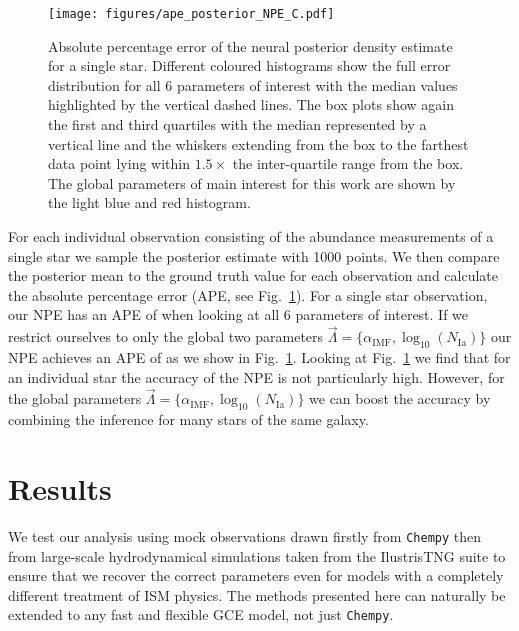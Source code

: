 \documentclass{aa}
\begin{document}
\begin{figure}[]
     \centering
     \texttt{[image: figures/ape\_posterior\_NPE\_C.pdf]}
     \vspace{-.5cm}
     \caption{Absolute percentage error of the neural posterior density estimate for a single star. Different coloured histograms show the full error distribution for all 6 parameters of interest with the median values highlighted by the vertical dashed lines. The box plots show again the first and third quartiles with the median represented by a vertical line and the whiskers extending from the box to the farthest data point lying within $1.5\times$ the inter-quartile range from the box. The global parameters of main interest for this work are shown by the light blue and red histogram.}
     \label{fig:posterior_APE}
\end{figure}


For each individual observation consisting of the abundance measurements of a single star we sample the posterior estimate with 1000 points. %
We then compare the posterior mean to the ground truth value for each observation and calculate the absolute percentage error (APE, see Fig.~\ref{fig:posterior_APE}). For a single star observation, our NPE has an APE of  when looking at all 6 parameters of interest. If we restrict ourselves to only the global two parameters $\vec\Lambda = \{\alpha_\mathrm{IMF},\log_{10}(N_\mathrm{Ia})\}$ our NPE achieves an APE of  as we show in Fig.~\ref{fig:posterior_APE}. Looking at Fig.~\ref{fig:posterior_APE} we find that for an individual star the accuracy of the NPE is not particularly high. However, for the global parameters $\vec\Lambda = \{\alpha_\mathrm{IMF},\log_{10}(N_\mathrm{Ia})\}$ we can boost the accuracy by combining the inference for many stars of the same galaxy.



\section{Results}
\label{sec: Results}

We test our analysis using mock observations drawn firstly from \texttt{Chempy} then from large-scale hydrodynamical simulations taken from the IlustrisTNG suite to ensure that we recover the correct parameters even for models with a completely different treatment of ISM physics. The methods presented here can naturally be extended to any fast and flexible GCE model, not just \texttt{Chempy}.
\end{document}
